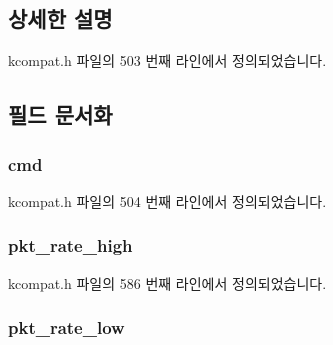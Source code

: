 \subsection{상세한 설명}


kcompat.\+h 파일의 503 번째 라인에서 정의되었습니다.



\subsection{필드 문서화}
\subsubsection[{\texorpdfstring{cmd}{cmd}}]{ cmd}\hypertarget{struct__kc__ethtool__coalesce_a62fe2a1dbf17d5a8561a5a7f5a97a9ba}{}\label{struct__kc__ethtool__coalesce_a62fe2a1dbf17d5a8561a5a7f5a97a9ba}


kcompat.\+h 파일의 504 번째 라인에서 정의되었습니다.

\subsubsection[{\texorpdfstring{pkt\+\_\+rate\+\_\+high}{pkt_rate_high}}]{ pkt\+\_\+rate\+\_\+high}\hypertarget{struct__kc__ethtool__coalesce_a524c1b2ef35b9f59e9d42884ba3a4dae}{}\label{struct__kc__ethtool__coalesce_a524c1b2ef35b9f59e9d42884ba3a4dae}


kcompat.\+h 파일의 586 번째 라인에서 정의되었습니다.

\subsubsection[{\texorpdfstring{pkt\+\_\+rate\+\_\+low}{pkt_rate_low}}]{ pkt\+\_\+rate\+\_\+low}\hypertarget{struct__kc__ethtool__coalesce_ab7bbeafb9648b54d22dc16520aeddc99}{}\label{struct__kc__ethtool__coalesce_ab7bbeafb9648b54d22dc16520aeddc99}


